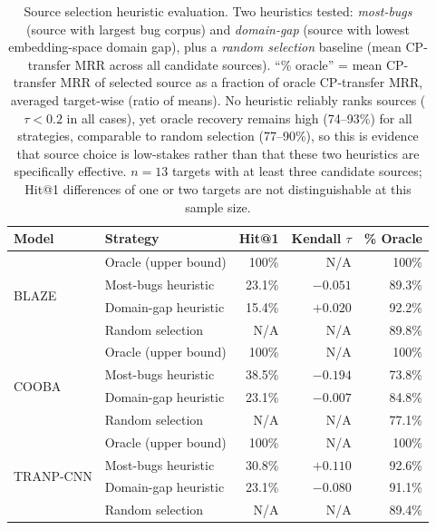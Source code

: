 \documentclass[a4paper,fleqn]{cas-dc}
\begin{document}
\begin{table}[t]
\centering
\caption{Source selection heuristic evaluation. Two heuristics tested: \emph{most-bugs}
(source with largest bug corpus) and \emph{domain-gap} (source with lowest embedding-space
domain gap), plus a \emph{random selection} baseline (mean CP-transfer MRR across all
candidate sources). ``\% oracle'' = mean CP-transfer MRR of selected source as a fraction of
oracle CP-transfer MRR, averaged target-wise (ratio of means). No heuristic reliably ranks sources ($\tau < 0.2$ in all cases),
yet oracle recovery remains high (74--93\%) for all strategies, comparable to random
selection (77--90\%), so this is evidence that source choice is low-stakes rather than
that these two heuristics are specifically effective. $n = 13$
targets with at least three candidate sources; Hit@1 differences of one or
two targets are not distinguishable at this sample size.}
\label{tab:source_selection}
\small
\begin{tabular}{@{}llrrr@{}}
\toprule
\textbf{Model} & \textbf{Strategy} & \textbf{Hit@1} & \textbf{Kendall $\tau$} & \textbf{\% Oracle} \\
\midrule
\multirow{4}{*}{BLAZE}
  & Oracle (upper bound)   & 100\%  & N/A    & 100\%  \\
  & Most-bugs heuristic    &  23.1\% & $-0.051$ & 89.3\% \\
  & Domain-gap heuristic   &  15.4\% & $+0.020$ & 92.2\% \\
  & Random selection       &  N/A    & N/A    & 89.8\% \\
\midrule
\multirow{4}{*}{COOBA}
  & Oracle (upper bound)   & 100\%  & N/A    & 100\%  \\
  & Most-bugs heuristic    &  38.5\% & $-0.194$ & 73.8\% \\
  & Domain-gap heuristic   &  23.1\% & $-0.007$ & 84.8\% \\
  & Random selection       &  N/A    & N/A    & 77.1\% \\
\midrule
\multirow{4}{*}{TRANP-CNN}
  & Oracle (upper bound)   & 100\%  & N/A    & 100\%  \\
  & Most-bugs heuristic    &  30.8\% & $+0.110$ & 92.6\% \\
  & Domain-gap heuristic   &  23.1\% & $-0.080$ & 91.1\% \\
  & Random selection       &  N/A    & N/A    & 89.4\% \\
\bottomrule
\end{tabular}
\end{table}
\end{document}
